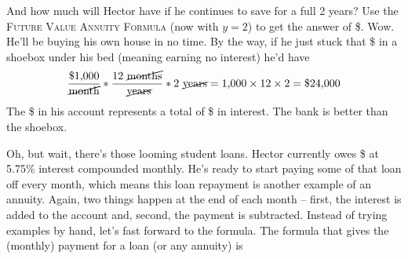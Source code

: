 And how much will Hector have if he continues to save for a full 2 years?  Use the   \textsc{Future Value Annuity Formula} (now with $y=2$) to get the answer of \$.
Wow.  He'll be buying his own house in no time.  By the way, if he just stuck that \$ in a shoebox under his bed (meaning earning no interest) he'd have 
$$\frac{\$\text{1,000}}{\cancel{\text{month}}} \ast \frac{12 \text{ \cancel{months}}}{\text{ \cancel{years}}} \ast 2 \text{ \cancel{years}}= \text{1,000} \times 12 \times 2 = \$\text{24,000}$$
The \$ in his account represents a total of \$ in interest.  The bank is better than the shoebox.

Oh, but wait, there's those looming student loans.  Hector currently owes \$ at 5.75\% interest compounded monthly.  He's ready to start paying some of that loan off every month, which means this loan repayment is another example of an annuity.  Again, two things happen at the end of each month -- first, the interest is added to the account and, second, the payment is subtracted.  Instead of trying examples by hand, let's fast forward to the formula.  The formula that gives the (monthly) payment for a loan (or any annuity) is

 \bigskip
\bigskip

